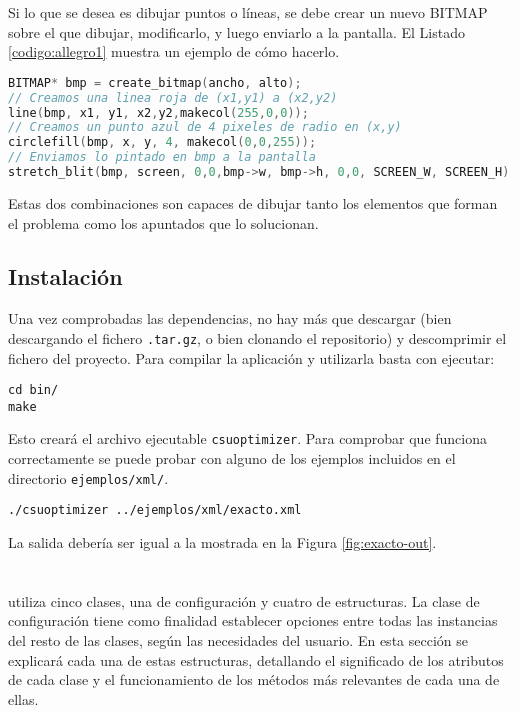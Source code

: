 Si lo que se desea es dibujar puntos o líneas, se debe crear un nuevo BITMAP
sobre el que dibujar, modificarlo, y luego enviarlo a la pantalla. 
El Listado \ref{codigo:allegro1} muestra un ejemplo de cómo hacerlo.

\begin{lstlisting}[language=C++, basicstyle=\ttfamily\footnotesize,
                   caption={Ejemplo de dibujo con Allegro},
                   label={codigo:allegro1}]
BITMAP* bmp = create_bitmap(ancho, alto);
// Creamos una linea roja de (x1,y1) a (x2,y2)
line(bmp, x1, y1, x2,y2,makecol(255,0,0));
// Creamos un punto azul de 4 pixeles de radio en (x,y)
circlefill(bmp, x, y, 4, makecol(0,0,255));
// Enviamos lo pintado en bmp a la pantalla
stretch_blit(bmp, screen, 0,0,bmp->w, bmp->h, 0,0, SCREEN_W, SCREEN_H);
\end{lstlisting}

Estas dos combinaciones son capaces de dibujar tanto los elementos que forman el
problema como los apuntados que lo solucionan.
\subsection{Instalación}
Una vez comprobadas las dependencias, no hay más que descargar (bien descargando
el fichero \texttt{.tar.gz}, o bien clonando el repositorio) y descomprimir el fichero del
proyecto. 
Para compilar la aplicación y utilizarla basta con ejecutar:

\begin{lstlisting}[numbers=none]
cd bin/
make
\end{lstlisting} 

Esto creará el archivo ejecutable \texttt{csuoptimizer}. 
Para comprobar que funciona correctamente se puede probar con alguno de los ejemplos incluidos en
el directorio \texttt{ejemplos/xml/}.

\begin{lstlisting}[numbers=none]
./csuoptimizer ../ejemplos/xml/exacto.xml
\end{lstlisting} 

La salida debería ser igual a la mostrada en la Figura \ref{fig:exacto-out}.

\section{\CSUO{}}
\CSUO{} utiliza cinco clases, una de configuración y cuatro de estructuras. 
La clase de configuración tiene como finalidad establecer opciones
entre todas las instancias del resto de las clases, según las necesidades del
usuario. En esta sección se explicará cada una de estas estructuras, detallando
el significado de los atributos de cada clase y el funcionamiento de los métodos más
relevantes de cada una de ellas. 
